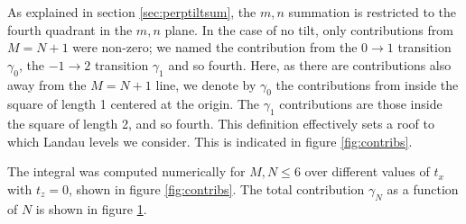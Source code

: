 As explained in section \ref{sec:perptiltsum}, the \( m,n \) summation is restricted to the fourth quadrant in the \( m,n \) plane.
In the case of no tilt, only contributions from \( M = N + 1 \) were non-zero;
we named the contribution from the \( 0\to 1 \) transition \( \gamma_0 \), the \( -1\to 2 \) transition \( \gamma_1 \) and so fourth.
Here, as there are contributions also away from the \( M=N + 1 \) line, we denote by \( \gamma_0 \) the contributions from inside the square of length 1 centered at the origin.
The \( \gamma_1 \) contributions are those inside the square of length 2, and so fourth.
This definition effectively sets a roof to which Landau levels we consider.
This is indicated in figure \ref{fig:contribs}.

The integral was computed numerically for \( M,N \leq 6 \) over different values of \( t_x \) with \( t_z = 0 \), shown in figure \ref{fig:contribs}.
The total contribution \( \gamma_N \) as a function of \( N \) is shown in figure \ref{fig:total_contribs}.

\begin{figure}[ht]
  \centering
  \caption{\label{fig:total_contribs} }
\end{figure}


